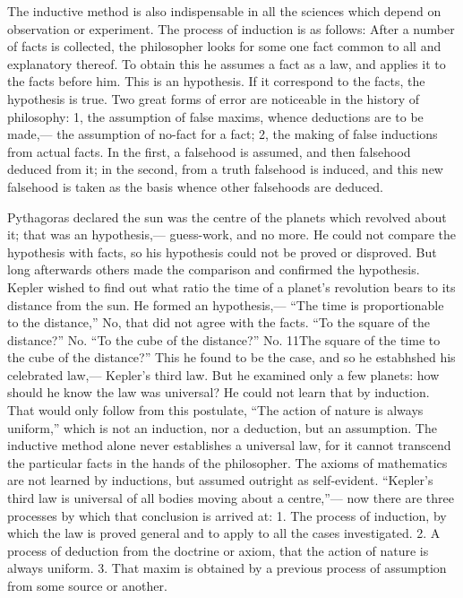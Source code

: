 \documentclass[12pt]{article}
\begin{document}
The inductive method is also indispensable in all the sciences which depend on observation or experiment. The process of induction is as follows: After a number of facts is collected, the philosopher looks for some one fact common to all and explanatory thereof. To obtain this he assumes a fact as a law, and applies it to the facts before him. This is an hypothesis. If it correspond to the facts, the hypothesis is true. Two great forms of error are noticeable in the history of philosophy: 1, the assumption of false maxims, whence deductions are to be made,--- the assumption of no-fact for a fact; 2, the making of false inductions from actual facts. In the first, a falsehood is assumed, and then falsehood deduced from it; in the second, from a truth falsehood is induced, and this new falsehood is taken as the basis whence other falsehoods are deduced. 

Pythagoras declared the sun was the centre of the planets which revolved about it; that was an hypothesis,--- guess-work, and no more. He could not compare the hypothesis with facts, so his hypothesis could not be proved or disproved. But long afterwards others made the comparison and confirmed the hypothesis. Kepler wished to find out what ratio the time of a planet's revolution bears to its distance from the sun. He formed an hypothesis,--- ``The time is proportionable to the distance,'' No, that did not agree with the facts. ``To the square of the distance?'' No. ``To the cube of the distance?'' No. 11The square of the time to the cube of the distance?'' This he found to be the case, and so he estabhshed his celebrated law,--- Kepler's third law. But he examined only a few planets: how should he know the law was universal? He could not learn that by induction. That would only follow from this postulate, ``The action of nature is always uniform,'' which is not an induction, nor a deduction, but an assumption. The inductive method alone never establishes a universal law, for it cannot transcend the particular facts in the hands of the philosopher. The axioms of mathematics are not learned by inductions, but assumed outright as self-evident. ``Kepler's third law is universal of all bodies moving about a centre,''--- now there are three processes by which that conclusion is arrived at: 1. The process of induction, by which the law is proved general and to apply to all the cases investigated. 2. A process of deduction from the doctrine or axiom, that the action of nature is always uniform. 3. That maxim is obtained by a previous process of assumption from some source or another. 
\end{document}
